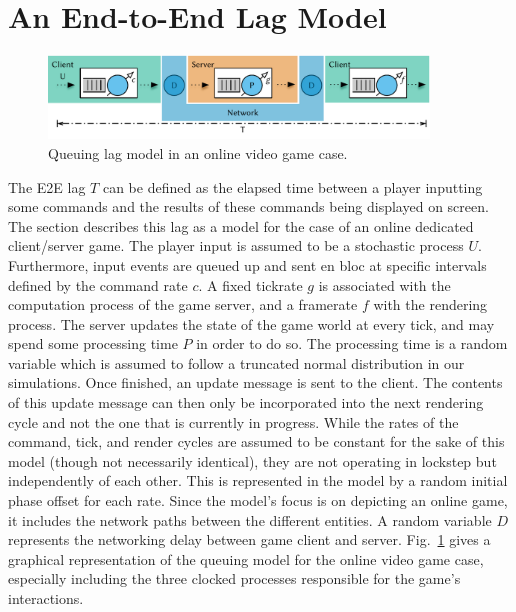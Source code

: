 \section{An End-to-End Lag Model}
\label{sec:model}

\begin{figure}[!t]
	\centering
	\includegraphics[width=0.9\textwidth]{../../../models/e2e-lag-model.pdf}
	\caption{Queuing lag model in an online video game case.}
\label{fig:queuing-model}
\end{figure}

The \gls{E2E} lag $T$ can be defined as the elapsed time between a player inputting some commands and the results of these commands being displayed on screen. The section describes this lag as a model for the case of an online dedicated client/server game. The player input is assumed to be a stochastic process $U$. Furthermore, input events are queued up and sent en bloc at specific intervals defined by the command rate $c$. A fixed tickrate $g$ is associated with the computation process of the game server, and a framerate $f$ with the rendering process. The server updates the state of the game world at every tick, and may spend some processing time $P$ in order to do so. The processing time is a random variable which is assumed to follow a truncated normal distribution in our simulations. Once finished, an update message is sent to the client. The contents of this update message can then only be incorporated into the next rendering cycle and not the one that is currently in progress. While the rates of the command, tick, and render cycles are assumed to be constant for the sake of this model (though not necessarily identical), they are not operating in lockstep but independently of each other. This is represented in the model by a random initial phase offset for each rate. Since the model's focus is on depicting an online game, it includes the network paths between the different entities. A random variable $D$ represents the networking delay between game client and server. Fig.~\ref{fig:queuing-model} gives a graphical representation of the queuing model for the online video game case, especially including the three clocked processes responsible for the game's interactions.

